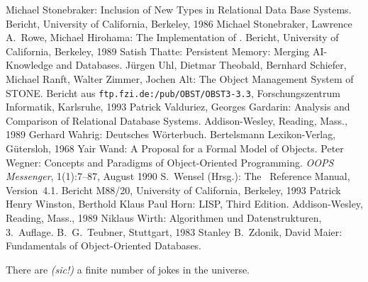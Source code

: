 \begin{thebibliography}{Stonebraker \etal\ 86a}
%
Michael Stonebraker:
Inclusion of New Types in Relational Data Base Systems.
Bericht, University of California, Berkeley, 1986
%
Michael Stonebraker, Lawrence A.\ Rowe, Michael Hirohama:
The Implementation of \postgres.
Bericht, University of California, Berkeley, 1989
%
Satish Thatte:
Persistent Memory: Merging AI-Knowledge and Databases.
%
J\"{u}rgen Uhl, Dietmar Theobald, Bernhard Schiefer, Michael Ranft,
Walter Zimmer, Jochen Alt:
The Object Management System of STONE.
Bericht aus {\tt ftp.fzi.de:/pub/OBST/OBST3-3.3},
Forschungszentrum Informatik, Karlsruhe, 1993
%
Patrick Valduriez, Georges Gardarin:
Analysis and Comparison of Relational Database Systems.
Addison-Wesley, Reading, Mass., 1989
%
Gerhard Wahrig:
Deutsches W\"{o}rterbuch.
Bertelsmann Lexikon-Verlag, G\"{u}tersloh, 1968
%
Yair Wand:
A Proposal for a Formal Model of Objects.
%
Peter Wegner:
Concepts and Paradigms of Object-Oriented Programming.
{\em OOPS Messenger\/},
1(1):7--87, August 1990
%
S.\ Wensel (Hrsg.):
The \postgres\ Reference Manual,
Version~4.1.
Bericht M88/20, University of California, Berkeley, 1993
%
Patrick Henry Winston, Berthold Klaus Paul Horn:
LISP, Third Edition.
Addison-Wesley, Reading, Mass., 1989
%
Niklaus Wirth:
Algorithmen und Datenstrukturen,
3.~Auf\-la\-ge.
B.\ G.\ Teubner, Stuttgart, 1983
%
Stanley B.\ Zdonik, David Maier:
Fundamentals of Object-Oriented Databases.
\end{thebibliography}
\vspace*{\fill}
\begin{fortune}
There are {\em (sic!)\/} a finite number of jokes in the universe.
\end{fortune}

